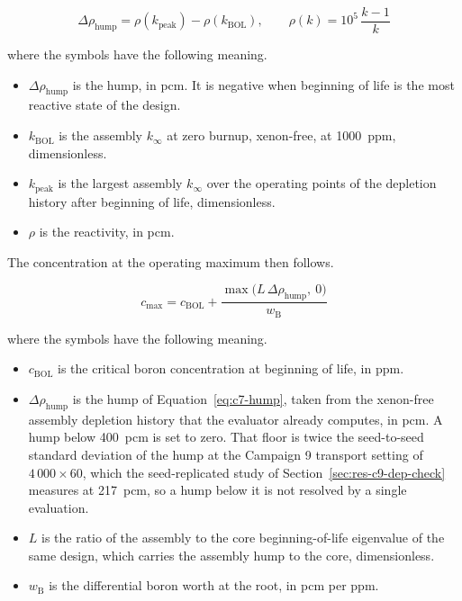 \begin{equation}
\Delta\rho_\mathrm{hump} = \rho(k_\mathrm{peak}) - \rho(k_\mathrm{BOL}),
\qquad \rho(k) = 10^5\,\frac{k-1}{k}
\label{eq:c7-hump}
\end{equation}

\noindent where the symbols have the following meaning.

\begin{itemize}
  \item $\Delta\rho_\mathrm{hump}$ is the hump, in pcm. It is negative
        when beginning of life is the most reactive state of the design.

  \item $k_\mathrm{BOL}$ is the assembly $k_\infty$ at zero burnup,
        xenon-free, at \SI{1000}{ppm}, dimensionless.

  \item $k_\mathrm{peak}$ is the largest assembly $k_\infty$ over the
        operating points of the depletion history after beginning of
        life, dimensionless.

  \item $\rho$ is the reactivity, in pcm.
\end{itemize}

The concentration at the operating maximum then follows.

\begin{equation}
c_\mathrm{max} = c_\mathrm{BOL} + \frac{\max\!\big(L\,\Delta\rho_\mathrm{hump},\ 0\big)}{w_\mathrm{B}}
\label{eq:c9-cmax}
\end{equation}

\noindent where the symbols have the following meaning.

\begin{itemize}
  \item $c_\mathrm{BOL}$ is the critical boron concentration at
        beginning of life, in ppm.

  \item $\Delta\rho_\mathrm{hump}$ is the hump of
        Equation~\eqref{eq:c7-hump}, taken from the xenon-free assembly
        depletion history that the evaluator already computes, in pcm.
        A hump below \SI{400}{pcm} is set to zero. That floor is twice
        the seed-to-seed standard deviation of the hump at the
        Campaign 9 transport setting of $4\,000\times60$, which the
        seed-replicated study of
        Section~\ref{sec:res-c9-dep-check} measures at \SI{217}{pcm}, so
        a hump below it is not resolved by a single evaluation.

  \item $L$ is the ratio of the assembly to the core beginning-of-life
        eigenvalue of the same design, which carries the assembly hump
        to the core, dimensionless.

  \item $w_\mathrm{B}$ is the differential boron worth at the root, in
        pcm per ppm.
\end{itemize}

